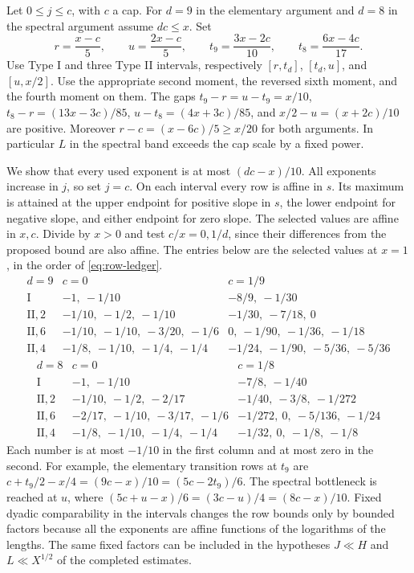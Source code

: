 \documentclass[11pt]{amsart}
\numberwithin{equation}{section}
\theoremstyle{remark}
\begin{document}
Let \(0\le j\le c\), with \(c\) a cap. For \(d=9\) in the
elementary argument and \(d=8\) in the spectral argument assume
\(dc\le x\). Set
\[
 r=\frac{x-c}{5},\qquad u=\frac{2x-c}{5},\qquad
 t_9=\frac{3x-2c}{10},\qquad t_8=\frac{6x-4c}{17}.
\]
Use Type I and three Type II intervals, respectively
\([r,t_d]\), \([t_d,u]\), and \([u,x/2]\). Use the appropriate
second moment, the reversed sixth moment, and the fourth moment
on them. The gaps \(t_9-r=u-t_9=x/10\), 
\(t_8-r=(13x-3c)/85\), \(u-t_8=(4x+3c)/85\), and
\(x/2-u=(x+2c)/10\) are positive. Moreover
\(r-c=(x-6c)/5\ge x/20\) for both arguments. In particular
\(L\) in the spectral band exceeds the cap scale by a fixed power.

We show that every used exponent is at most \((dc-x)/10\).
All exponents increase in \(j\), so set \(j=c\).
On each interval every row is affine in \(s\).
Its maximum is attained at the upper endpoint for positive slope
in \(s\), the lower endpoint for negative slope, and either
endpoint for zero slope. The selected values are affine in \(x,c\).
Divide by \(x>0\) and test \(c/x=0,1/d\), since their differences
from the proposed bound are also affine. The entries below are
the selected values at \(x=1\), in the order of
\eqref{eq:row-ledger}.
\[
\begin{array}{c|c|c}
 d=9&c=0&c=1/9\\ \hline
 \mathrm{I}&-1,\ -1/10&-8/9,\ -1/30\\
 \mathrm{II},2&-1/10,\ -1/2,\ -1/10&-1/30,\ -7/18,\ 0\\
 \mathrm{II},6&-1/10,\ -1/10,\ -3/20,\ -1/6&
             0,\ -1/90,\ -1/36,\ -1/18\\
 \mathrm{II},4&-1/8,\ -1/10,\ -1/4,\ -1/4&
             -1/24,\ -1/90,\ -5/36,\ -5/36
\end{array}
\]
\[
\begin{array}{c|c|c}
 d=8&c=0&c=1/8\\ \hline
 \mathrm{I}&-1,\ -1/10&-7/8,\ -1/40\\
 \mathrm{II},2&-1/10,\ -1/2,\ -2/17&-1/40,\ -3/8,\ -1/272\\
 \mathrm{II},6&-2/17,\ -1/10,\ -3/17,\ -1/6&
             -1/272,\ 0,\ -5/136,\ -1/24\\
 \mathrm{II},4&-1/8,\ -1/10,\ -1/4,\ -1/4&
             -1/32,\ 0,\ -1/8,\ -1/8
\end{array}
\]
Each number is at most \(-1/10\) in the first column and at most
zero in the second. For example, the elementary transition rows at
\(t_9\) are \(c+t_9/2-x/4=(9c-x)/10=(5c-2t_9)/6\).
The spectral bottleneck is reached at \(u\), where
\((5c+u-x)/6=(3c-u)/4=(8c-x)/10\).
Fixed dyadic comparability in the intervals changes the row
bounds only by bounded factors because all the exponents are
affine functions of the logarithms of the lengths. The same
fixed factors can be included in the hypotheses \(J\ll H\) and
\(L\ll X^{1/2}\) of the completed estimates.
\end{document}
